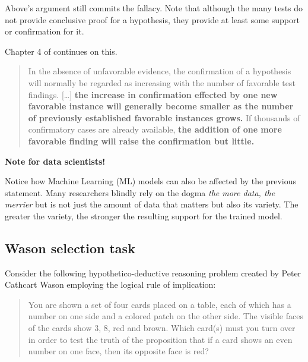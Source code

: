 \documentclass[
]{book}
\newenvironment{rnote}{\par\raggedleft}{\par}
\begin{document}
Above's argument still commits the fallacy. Note that although the many tests do not provide conclusive proof for a hypothesis, they provide at least some support or confirmation for it.

\begin{rnote}
Chapter 4 of \citep{hempel-pos} continues on this.

\end{rnote}

\begin{quote}
In the absence of unfavorable evidence, the confirmation of a hypothesis will normally be regarded as increasing with the number of favorable test findings. {[}\ldots{]} \textbf{the increase in confirmation effected by one new favorable instance will generally become smaller as the number of previously established favorable instances grows.} If thousands of confirmatory cases are already available, \textbf{the addition of one more favorable finding will raise the confirmation but little.}
\end{quote}

\begin{tipbox}

\textbf{Note for data scientists!}

Notice how Machine Learning (ML) models can also be affected by the previous statement. Many researchers blindly rely on the dogma \emph{the more data, the merrier} but is not just the amount of data that matters but also its variety. The greater the variety, the stronger the resulting support for the trained model.

\end{tipbox}

\hypertarget{wason}{%
\subsection{Wason selection task}\label{wason}}

Consider the following hypothetico-deductive reasoning problem created by Peter Cathcart Wason employing the logical rule of implication:

\begin{quote}
You are shown a set of four cards placed on a table, each of which has a number on one side and a colored patch on the other side. The visible faces of the cards show 3, 8, red and brown. Which card(s) must you turn over in order to test the truth of the proposition that if a card shows an even number on one face, then its opposite face is red?
\end{quote}
\end{document}
